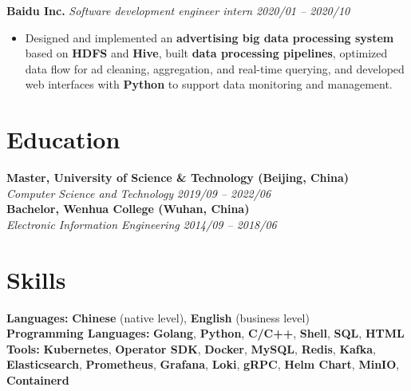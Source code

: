 \documentclass[a4paper,10pt]{article}
\begin{document}
\noindent\textbf{Baidu Inc.} \hfill \textit{Software development engineer intern} \hfill \textit{2020/01 -- 2020/10}\vspace{-0.5em}
\begin{itemize}[leftmargin=*,noitemsep]
    \item Designed and implemented an \textbf{advertising big data processing system} based on \textbf{HDFS} and \textbf{Hive}, built \textbf{data processing pipelines}, optimized data flow for ad cleaning, aggregation, and real-time querying, and developed web interfaces with \textbf{Python} to support data monitoring and management.
\end{itemize}

\section*{Education}

\textbf{Master, University of Science \& Technology (Beijing, China)} \\ 
\textit{Computer Science and Technology} \hfill \textit{2019/09 -- 2022/06} \\

\textbf{Bachelor, Wenhua College (Wuhan, China)} \\ 
\textit{Electronic Information Engineering} \hfill \textit{2014/09 -- 2018/06}

\section*{Skills}

\textbf{Languages:} \textbf{Chinese} (native level), \textbf{English} (business level) \\
\textbf{Programming Languages:} \textbf{Golang}, \textbf{Python}, \textbf{C/C++}, \textbf{Shell}, \textbf{SQL}, \textbf{HTML} \\ 
\textbf{Tools:} \textbf{Kubernetes}, \textbf{Operator SDK}, \textbf{Docker}, \textbf{MySQL}, \textbf{Redis}, \textbf{Kafka}, \textbf{Elasticsearch}, \textbf{Prometheus}, \textbf{Grafana}, \textbf{Loki}, \textbf{gRPC}, \textbf{Helm Chart}, \textbf{MinIO}, \textbf{Containerd}
\end{document}
